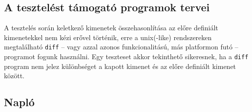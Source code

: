 	\subsection{A tesztelést támogató programok tervei}
		A tesztelés során keletkező kimenetek összehasonlítása az előre definiált kimenetekkel nem kézi erővel történik, erre a unix(-like) rendszereken megtalálható \texttt{diff} -- vagy azzal azonos funkcionalitású, más platformon futó -- programot fogunk használni. Egy teszteset akkor tekinthető sikeresnek, ha a \texttt{diff} program nem jelez különbséget a kapott kimenet és az előre definiált kimenet között.


	\subsection{Napló}

